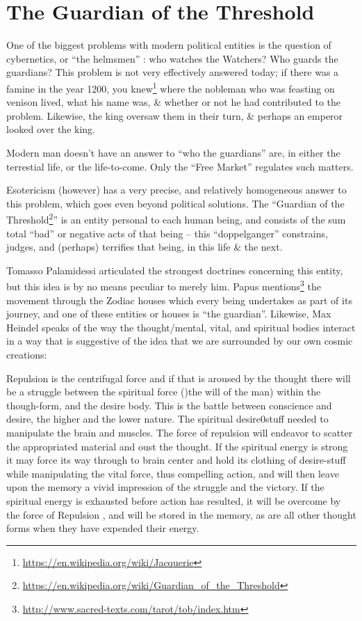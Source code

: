\section{The Guardian of the Threshold}

One of the biggest problems with modern political entities is the question of cybernetics, or ``the helmsmen'' : who watches the Watchers? Who guards the guardians? This problem is not very effectively answered today; if there was a famine in the year 1200, you knew\footnote{\url{https://en.wikipedia.org/wiki/Jacquerie}} where the nobleman who was feasting on venison lived, what his name was, \& whether or not he had contributed to the problem. Likewise, the king oversaw them in their turn, \& perhaps an emperor looked over the king.

Modern man doesn't have an answer to ``who the guardians'' are, in either the terrestial life, or the life-to-come. Only the ``Free Market'' regulates such matters.

Esotericism (however) has a very precise, and relatively homogeneous answer to this problem, which goes even beyond political solutions. The ``Guardian of the Threshold\footnote{\url{https://en.wikipedia.org/wiki/Guardian\_of\_the\_Threshold}}'' is an entity personal to each human being, and consists of the sum total ``bad'' or negative acts of that being -- this ``doppelganger'' constrains, judges, and (perhaps) terrifies that being, in this life \& the next.

Tomasso Palamidessi articulated the strongest doctrines concerning this entity, but this idea is by no means peculiar to merely him. Papus mentions\footnote{\url{http://www.sacred-texts.com/tarot/tob/index.htm}} the movement through the Zodiac houses which every being undertakes as part of its journey, and one of these entities or houses is ``the guardian''. Likewise, Max Heindel speaks of the way the thought/mental, vital, and spiritual bodies interact in a way that is suggestive of the idea that we are surrounded by our own cosmic creations:

\begin{quotex}
Repulsion is the centrifugal force and if that is aroused by the thought there will be a struggle between the spiritual force ()the will of the man) within the though-form, and the desire body. This is the battle between conscience and desire, the higher and the lower nature. The spiritual desire0stuff needed to manipulate the brain and muscles. The force of repulsion will endeavor to scatter the appropriated material and oust the thought. If the spiritual energy is strong it may force its way through to brain center and hold its clothing of desire-stuff while manipulating the vital force, thus compelling action, and will then leave upon the memory a vivid impression of the struggle and the victory. If the spiritual energy is exhausted before action has resulted, it will be overcome by the force of Repulsion , and will be stored in the memory, as are all other thought forms when they have expended their energy.
\end{quotex}


